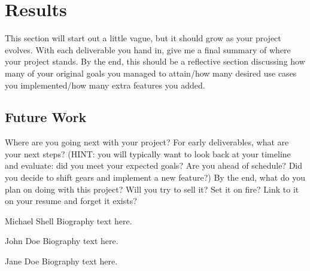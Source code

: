 \documentclass[10pt,conference,onecolumn,compsoc]{IEEEtran}
\begin{document}
\section{Results}
This section will start out a little vague, but it should grow as your project evolves.  With each deliverable you hand in, give me a final summary of where your project stands.  By the end, this should be a reflective section discussing how many of your original goals you managed to attain/how many desired use cases you implemented/how many extra features you added.

\subsection{Future Work}
Where are you going next with your project?
For early deliverables, what are your next steps?  (HINT: you will typically want to look back at your timeline and evaluate: did you meet your expected goals?  Are you ahead of schedule?  Did you decide to shift gears and implement a new feature?)
By the end, what do you plan on doing with this project?  Will you try to sell it?  Set it on fire?  Link to it on your resume and forget it exists?







\begin{IEEEbiography}{Michael Shell}
Biography text here.
\end{IEEEbiography}

\begin{IEEEbiographynophoto}{John Doe}
Biography text here.
\end{IEEEbiographynophoto}


\begin{IEEEbiographynophoto}{Jane Doe}
Biography text here.
\end{IEEEbiographynophoto}





\end{document}
